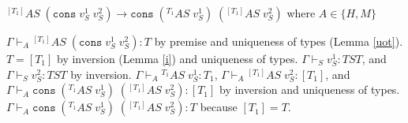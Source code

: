 \begin{case}
$^{[T_{1}]}AS\;(\mathtt{cons}\;v_{S}^{1}\;v_{S}^{2})\rightarrow\mathtt{cons}\;(^{T_{1}}AS\;v_{S}^{1})\;(^{[T_{1}]}AS\;v_{S}^{2})$ where $A\in\lbrace H,M\rbrace$

$\Gamma\vdash_{A}{^{[T_{1}]}A}S\;(\mathtt{cons}\;v_{S}^{1}\;v_{S}^{2}):T$ by premise and uniqueness of types (Lemma \ref{uot}).  $T=[T_{1}]$ by inversion (Lemma \ref{i}) and uniqueness of types.  $\Gamma\vdash_{S}v_{S}^{1}:TST$, and $\Gamma\vdash_{S}v_{S}^{2}:TST$ by inversion.  $\Gamma\vdash_{A}{^{T_{1}}A}S\;v_{S}^{1}:T_{1}$, $\Gamma\vdash_{A}{^{[T_{1}]}A}S\;v_{S}^{2}:[T_{1}]$, and $\Gamma\vdash_{A}\mathtt{cons}\;(^{T_{1}}AS\;v_{S}^{1})\;(^{[T_{1}]}AS\;v_{S}^{2}):[T_{1}]$ by inversion and uniqueness of types.  $\Gamma\vdash_{A}\mathtt{cons}\;(^{T_{1}}AS\;v_{S}^{1})\;(^{[T_{1}]}AS\;v_{S}^{2}):T$ because $[T_{1}]=T$.
\end{case}